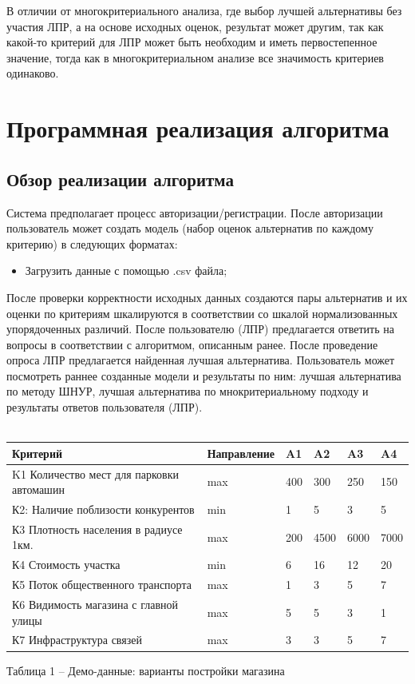 \documentclass[a4paper, 14pt]{report}
\begin{document}
	В отличии от многокритериального анализа, где выбор лучшей альтернативы без участия ЛПР, а на основе исходных оценок, результат может другим, так как какой-то критерий для ЛПР может быть необходим и иметь первостепенное значение, тогда как в многокритериальном анализе все значимость критериев одинаково.

\chapter{Программная реализация алгоритма}
	\section{Обзор реализации алгоритма}
	Система предполагает процесс авторизации/регистрации. После авторизации пользователь может создать модель (набор оценок альтернатив по каждому критерию) в следующих форматах: 
	\begin{itemize}
		-данные (набор готовых данных);
		\item Загрузить данные с помощью .csv файла;
	\end{itemize}

	После проверки корректности исходных данных создаются пары альтернатив и их оценки по критериям шкалируются в соответствии со шкалой нормализованных упорядоченных различий. 
	После пользователю (ЛПР) предлагается ответить на вопросы в соответствии с алгоритмом, описанным ранее. После проведение опроса ЛПР предлагается найденная лучшая альтернатива. 
	Пользователь может посмотреть раннее созданные модели и результаты по ним: лучшая альтернатива по методу ШНУР, лучшая альтернатива по мнокритериальному подходу и результаты ответов пользователя (ЛПР).
\\ \\
	\begin{tabular}{llllll}
		\hline
		Критерий                                  & Направление & A1  & A2   & A3   & A4   \\ \hline
		K1 Количество мест для парковки автомашин & max         & 400 & 300  & 250  & 150  \\
		К2: Наличие поблизости конкурентов        & min         & 1   & 5    & 3    & 5    \\
		К3 Плотность населения в радиусе 1км.     & max         & 200 & 4500 & 6000 & 7000 \\
		К4 Стоимость участка                      & min         & 6   & 16   & 12   & 20   \\
		К5 Поток общественного транспорта         & max         & 1   & 3    & 5    & 7    \\
		К6 Видимость магазина с главной улицы     & max         & 5   & 5    & 3    & 1    \\
		К7 Инфраструктура связей                  & max         & 3   & 3    & 5    & 7    \\ \hline
	\end{tabular}
Таблица 1 – Демо-данные: варианты постройки магазина\\
\end{document}
